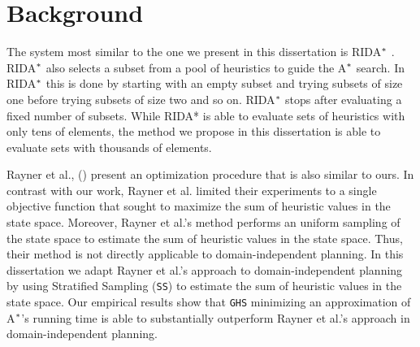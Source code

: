 
 
\chapter{Background}\label{ch:background}
\noindent
The system most similar to the one we present in this dissertation is RIDA$\sp{*}$ \cite{BarleySantiagoOver}. RIDA$\sp{*}$ also selects a subset from a pool of heuristics to guide the A$\sp{*}$ search. In RIDA$\sp{*}$ this is done by starting with an empty subset and trying subsets of size one before trying subsets of size two and so on. RIDA$\sp{*}$ stops after evaluating a fixed number of subsets. While RIDA* is able to evaluate sets of heuristics with only tens of elements, the method we propose in this dissertation is able to evaluate sets with thousands of elements.

Rayner et al., (\citeyear{raynersss13}) present an optimization procedure that is also similar to ours. In contrast with our work, Rayner et al. limited their experiments to a single objective function that sought to maximize the sum of heuristic values in the state space. Moreover, Rayner et al.'s method performs an uniform sampling of the state space to estimate the sum of heuristic values in the state space. Thus, their method is not directly applicable to domain-independent planning. In this dissertation we adapt Rayner et al.'s approach to domain-independent planning by using Stratified Sampling (\texttt{SS}) \cite{chen1992heuristic} to estimate the sum of heuristic values in the state space. Our empirical results show that \texttt{GHS} minimizing an approximation of A$\sp{*}$'s running time is able to substantially outperform Rayner et al.'s approach in domain-independent planning. 


